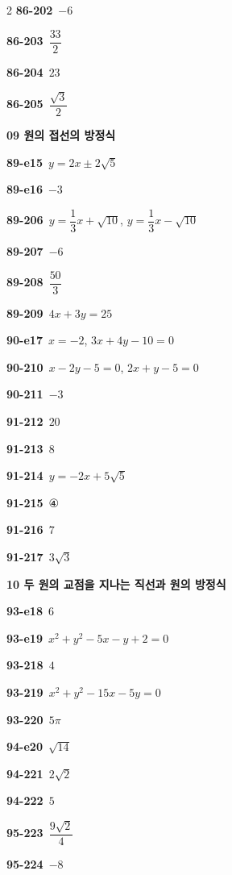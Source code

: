 \documentclass[10pt,a4paper]{article}
\begin{document}
\begin{multicols}{2}
\noindent\textbf{86-202}\ $-6$\par
\noindent\textbf{86-203}\ $\dfrac{33}{2}$\par
\noindent\textbf{86-204}\ $23$\par
\noindent\textbf{86-205}\ $\dfrac{\sqrt{3}}{2}$\par
\noindent\textbf{09 원의 접선의 방정식}\par\smallskip
\noindent\textbf{89-e15}\ $y=2x\pm 2\sqrt{5}$\par
\noindent\textbf{89-e16}\ $-3$\par
\noindent\textbf{89-206}\ $y=\dfrac{1}{3}x+\sqrt{10}$, $y=\dfrac{1}{3}x-\sqrt{10}$\par
\noindent\textbf{89-207}\ $-6$\par
\noindent\textbf{89-208}\ $\dfrac{50}{3}$\par
\noindent\textbf{89-209}\ $4x+3y=25$\par
\noindent\textbf{90-e17}\ $x=-2$, $3x+4y-10=0$\par
\noindent\textbf{90-210}\ $x-2y-5=0$, $2x+y-5=0$\par
\noindent\textbf{90-211}\ $-3$\par
\noindent\textbf{91-212}\ $20$\par
\noindent\textbf{91-213}\ $8$\par
\noindent\textbf{91-214}\ $y=-2x+5\sqrt{5}$\par
\noindent\textbf{91-215}\ ④\par
\noindent\textbf{91-216}\ $7$\par
\noindent\textbf{91-217}\ $3\sqrt{3}$\par
\noindent\textbf{10 두 원의 교점을 지나는 직선과 원의 방정식}\par\smallskip
\noindent\textbf{93-e18}\ $6$\par
\noindent\textbf{93-e19}\ $x^2+y^2-5x-y+2=0$\par
\noindent\textbf{93-218}\ $4$\par
\noindent\textbf{93-219}\ $x^2+y^2-15x-5y=0$\par
\noindent\textbf{93-220}\ $5\pi$\par
\noindent\textbf{94-e20}\ $\sqrt{14}$\par
\noindent\textbf{94-221}\ $2\sqrt{2}$\par
\noindent\textbf{94-222}\ $5$\par
\noindent\textbf{95-223}\ $\dfrac{9\sqrt{2}}{4}$\par
\noindent\textbf{95-224}\ $-8$\par

\end{multicols}
\end{document}
